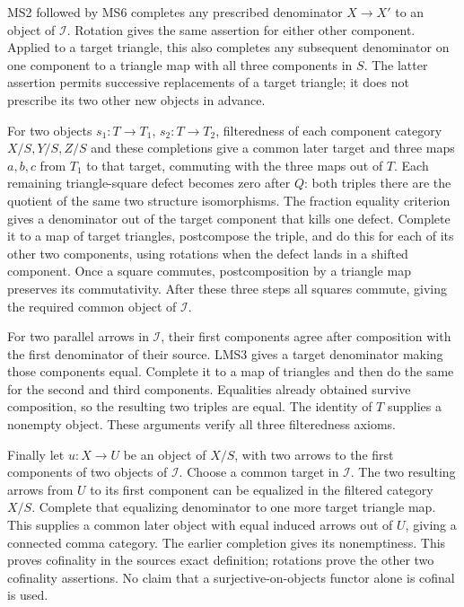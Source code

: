 \documentclass[11pt]{article}
\begin{document}
MS2 followed by MS6 completes any prescribed denominator \(X\to X'\) to an object of \(\mathcal I\). Rotation gives the same assertion for either other component. Applied to a target triangle,\allowbreak{} this also completes any subsequent denominator on one component to a triangle map with all three components in \(S\). The latter assertion permits successive replacements of a target triangle; it does not prescribe its two other new objects in advance.

For two objects \(s_1:T\to T_1\),\allowbreak{} \(s_2:T\to T_2\),\allowbreak{} filteredness of each component category \(X/S,Y/S,Z/S\) and these completions give a common later target and three maps \(a,b,c\) from \(T_1\) to that target,\allowbreak{} commuting with the three maps out of \(T\). Each remaining triangle-square defect becomes zero after \(Q\):\allowbreak{} both triples there are the quotient of the same two structure isomorphisms. The fraction equality criterion gives a denominator out of the target component that kills one defect. Complete it to a map of target triangles,\allowbreak{} postcompose the triple,\allowbreak{} and do this for each of its other two components,\allowbreak{} using rotations when the defect lands in a shifted component. Once a square commutes,\allowbreak{} postcomposition by a triangle map preserves its commutativity. After these three steps all squares commute,\allowbreak{} giving the required common object of \(\mathcal I\).

For two parallel arrows in \(\mathcal I\),\allowbreak{} their first components agree after composition with the first denominator of their source. LMS3 gives a target denominator making those components equal. Complete it to a map of triangles and then do the same for the second and third components. Equalities already obtained survive composition,\allowbreak{} so the resulting two triples are equal. The identity of \(T\) supplies a nonempty object. These arguments verify all three filteredness axioms.

Finally let \(u:X\to U\) be an object of \(X/S\),\allowbreak{} with two arrows to the first components of two objects of \(\mathcal I\). Choose a common target in \(\mathcal I\). The two resulting arrows from \(U\) to its first component can be equalized in the filtered category \(X/S\). Complete that equalizing denominator to one more target triangle map. This supplies a common later object with equal induced arrows out of \(U\),\allowbreak{} giving a connected comma category. The earlier completion gives its nonemptiness. This proves cofinality in the source\textquotesingle s exact definition; rotations prove the other two cofinality assertions. No claim that a surjective-on-objects functor alone is cofinal is used.
\end{document}
